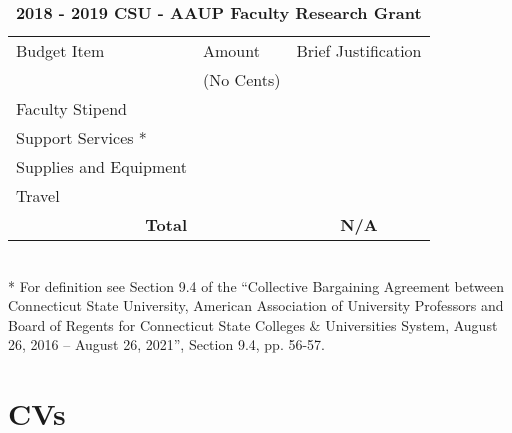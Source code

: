 \documentclass[]{article}
\begin{document}
\begin{table}[H]
	\caption{\textbf{2018 - 2019 CSU - AAUP Faculty Research Grant}}
	\begin{tabular}{|p{4cm}|p{3cm}|c|}
		\hline 
		Budget Item	&Amount &  Brief Justification\\ 
		&(No Cents) &   \\ 
		\hline 
		Faculty Stipend	&  &  \\ 
		\hline 
		Support Services *	&  &  \\ 
		\hline 
		Supplies and Equipment	&  &  \\ 
		\hline 
		Travel	&  &  \\ 
		\hline \hline
		\multicolumn{1}{|r|}{\textbf{Total}}	&  & \textbf{N/A} \\ 
		\hline 
	\end{tabular} \\
	* For definition see Section 9.4 of the ``Collective Bargaining Agreement between Connecticut State University, American Association of University Professors and Board of Regents for Connecticut State Colleges \& Universities System, August 26, 2016 – August 26, 2021'', Section 9.4, pp. 56-57.
\end{table}
 
 \section{CVs}
\end{document}

